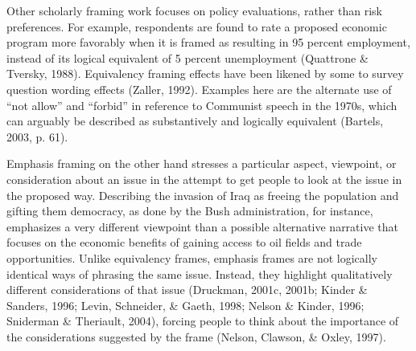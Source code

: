 \documentclass[12pt,econ]{sources/authesis}
\begin{document}
Other scholarly framing work focuses on policy evaluations, rather than risk preferences. For example, respondents are found to rate a proposed economic program more favorably when it is framed as resulting in 95 percent employment, instead of its logical equivalent of 5 percent unemployment (Quattrone \& Tversky, 1988). Equivalency framing effects have been likened by some to survey question wording effects (Zaller, 1992). Examples here are the alternate use of ``not allow'' and ``forbid'' in reference to Communist speech in the 1970s, which can arguably be described as substantively and logically equivalent (Bartels, 2003, p. 61).

Emphasis framing on the other hand stresses a particular aspect, viewpoint, or consideration about an issue in the attempt to get people to look at the issue in the proposed way. Describing the invasion of Iraq as freeing the population and gifting them democracy, as done by the Bush administration, for instance, emphasizes a very different viewpoint than a possible alternative narrative that focuses on the economic benefits of gaining access to oil fields and trade opportunities. Unlike equivalency frames, emphasis frames are not logically identical ways of phrasing the same issue. Instead, they highlight qualitatively different considerations of that issue (Druckman, 2001c, 2001b; Kinder \& Sanders, 1996; Levin, Schneider, \& Gaeth, 1998; Nelson \& Kinder, 1996; Sniderman \& Theriault, 2004), forcing people to think about the importance of the considerations suggested by the frame (Nelson, Clawson, \& Oxley, 1997).
\end{document}
